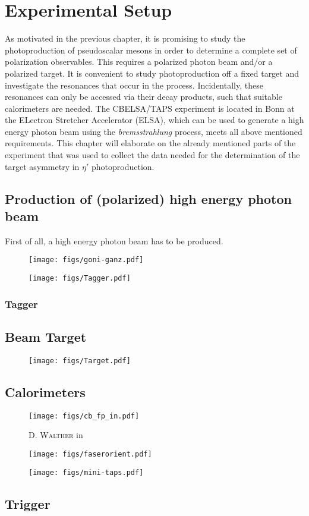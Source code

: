 \chapter{Experimental Setup}
\label{chap:exp}
As motivated in the previous chapter, it is promising to study the photoproduction of pseudoscalar mesons in order to determine a complete set of polarization observables. This requires a polarized photon beam and/or a polarized target. It is convenient to study photoproduction off a fixed target and investigate the resonances that occur in the process. Incidentally, these resonances can only be accessed via their decay products, such that suitable calorimeters are needed. The CBELSA/TAPS experiment is  located in Bonn  at the ELectron Stretcher Accelerator (ELSA), which can be used to generate a high energy photon beam using the \emph{bremsstrahlung} process, meets all above mentioned requirements. This chapter will elaborate on the already mentioned parts of the experiment that was used to collect the data needed for the determination of the target asymmetry in $\eta'$ photoproduction.

\section{Production of (polarized) high energy photon beam}
First of all, a high energy photon beam has to be produced.
\begin{figure}[htbp]
	\centering
	\texttt{[image: figs/goni-ganz.pdf]}
	\caption{\cite{cb}}
\end{figure}
\begin{figure}[htbp]
	\centering
	\texttt{[image: figs/Tagger.pdf]}
	\caption{\cite{cb}}
\end{figure}
\subsection{Tagger}
\label{subsec:tag}
\section{Beam Target}

\begin{figure}[htbp]
	\centering
	\texttt{[image: figs/Target.pdf]}
	\caption{\cite{cb}}
\end{figure}
\section{Calorimeters}
\begin{figure}[htbp]
	\centering
	\texttt{[image: figs/cb\_fp\_in.pdf]}
	\caption{\textsc{D. Walther} in \cite{urban}}
\end{figure}
\begin{figure}[htbp]
	\centering
	\texttt{[image: figs/faserorient.pdf]}
	\caption{\cite{cb}}
\end{figure}
\begin{figure}[htbp]
	\centering
	\texttt{[image: figs/mini-taps.pdf]}
	\caption{\cite{cb}}
\end{figure}

\section{Trigger}